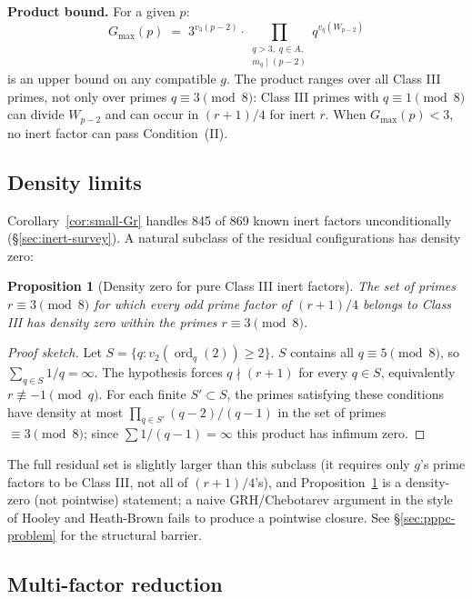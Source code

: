 \documentclass[11pt]{amsart}
\theoremstyle{plain}
\newtheorem{proposition}[theorem]{Proposition}
\theoremstyle{definition}
\theoremstyle{remark}
\numberwithin{equation}{section}
\newcommand{\ord}{\operatorname{ord}}
\begin{document}
\textbf{Product bound.} For a given $p$:
\[
  G_{\max}(p) \;=\; 3^{v_3(p - 2)} \cdot
  \prod_{\substack{q > 3,\; q \in A,\\ m_q \mid (p-2)}}
  q^{v_q(W_{p-2})}
\]
is an upper bound on any compatible $g$. The product ranges over all Class III primes, not only over primes $q \equiv 3 \pmod 8$: Class III primes with $q \equiv 1 \pmod 8$ can divide $W_{p-2}$ and can occur in $(r+1)/4$ for inert $r$. When $G_{\max}(p) < 3$, no inert factor can pass Condition~(II).

\subsection{Density limits}

Corollary~\ref{cor:small-Gr} handles 845 of 869 known inert factors unconditionally (\S\ref{sec:inert-survey}). A natural subclass of the residual configurations has density zero:

\begin{proposition}[Density zero for pure Class III inert factors]\label{prop:density-zero}
The set of primes $r \equiv 3 \pmod 8$ for which every odd prime factor of $(r + 1)/4$ belongs to Class III has density zero within the primes $r \equiv 3 \pmod 8$.
\end{proposition}

\begin{proof}[Proof sketch]
Let $S = \{q : v_2(\ord_q(2)) \geq 2\}$. $S$ contains all $q \equiv 5 \pmod 8$, so $\sum_{q \in S} 1/q = \infty$. The hypothesis forces $q \nmid (r + 1)$ for every $q \in S$, equivalently $r \not\equiv -1 \pmod q$. For each finite $S' \subset S$, the primes satisfying these conditions have density at most $\prod_{q \in S'} (q-2)/(q-1)$ in the set of primes $\equiv 3 \pmod 8$; since $\sum 1/(q-1) = \infty$ this product has infimum zero.
\end{proof}

The full residual set is slightly larger than this subclass (it requires only $g$'s prime factors to be Class III, not all of $(r+1)/4$'s), and Proposition~\ref{prop:density-zero} is a density-zero (not pointwise) statement; a naive GRH/Chebotarev argument in the style of Hooley \cite{ref:Hooley} and Heath-Brown \cite{ref:HeathBrown} fails to produce a pointwise closure. See \S\ref{sec:pppc-problem} for the structural barrier.

\subsection{Multi-factor reduction}\label{sec:multi-factor}
\end{document}
